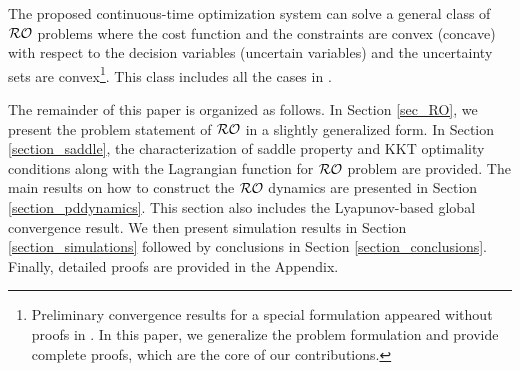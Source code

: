 \documentclass[journal,twoside,web]{ieeecolor}
\newcommand{\rev}[1]{\textcolor{revisionblue}{#1}}
\begin{document}





The proposed continuous-time optimization system can solve a general class of ${\cal RO}$ problems where the cost function and the constraints are convex (concave) with respect to the decision variables (uncertain variables) and the uncertainty sets are convex\footnote{Preliminary convergence results for a special formulation appeared without proofs in \cite{ebrahimi2019continuous}. In this paper, we generalize the problem formulation and provide complete proofs, which are the core of our contributions.}. This class includes all the cases in \cite[~Table 1]{gorissen20152}.

The remainder of this paper is organized as follows. In Section \ref{sec_RO}, we present the problem statement of ${\cal RO}$ in a slightly generalized form. In Section \ref{section_saddle}, the characterization of saddle property and KKT optimality conditions along with the Lagrangian function for ${\cal RO}$ problem are provided. The main results on how to construct the ${\cal RO}$ dynamics \rev{are} presented in Section \ref{section_pddynamics}. This section also includes the Lyapunov-based global convergence result. We then present simulation results in Section \ref{section_simulations} followed by conclusions in Section \ref{section_conclusions}.
Finally, detailed proofs are \rev{provided} in the Appendix.
\end{document}

